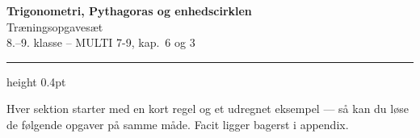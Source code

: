 \documentclass[11pt,a4paper]{article}
\begin{document}
\begin{center}
  {\Large\bfseries Trigonometri, Pythagoras og enhedscirklen}\\[2pt]
  {\color{gxu-inksoft}\large Træningsopgavesæt}\\[6pt]
  {\color{gxu-inksoft}\small 8.--9. klasse \quad -- \quad MULTI 7-9, kap.\ 6 og 3}
\end{center}

\vspace{6pt}
\hrule height 0.4pt
\vspace{10pt}

\noindent
Hver sektion starter med en kort regel og et udregnet eksempel --- så kan du
løse de følgende opgaver på samme måde. Facit ligger bagerst i appendix.






\end{document}
